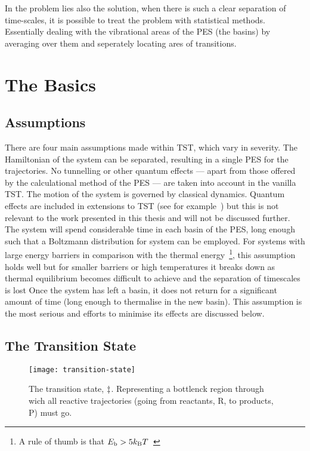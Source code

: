 In the problem lies also the solution, when there is such a clear separation of time-scales, it is possible to treat the problem with statistical methods.
Essentially dealing with the vibrational areas of the PES (the basins) by averaging over them and seperately locating ares of transitions.

\section{The Basics}
\subsection{Assumptions}
There are four main assumptions made within TST, which vary in severity.
The Hamiltonian of the system can be separated, resulting in a single PES for the trajectories.
No tunnelling or other quantum effects --- apart from those offered by the calculational method of the PES --- are taken into account in the vanilla TST.
The motion of the system is governed by classical dynamics.
Quantum effects are included in extensions to TST (see for example~\cite{qtst-hj-1997, qtst-hj-1998, qtst-hj-2009}) but this is not relevant to the work presented in this thesis and will not be discussed further.
The system will spend considerable time in each basin of the PES, long enough such that a Boltzmann distribution for system can be employed.
For systems with large energy barriers in comparison with the thermal energy~\footnote{A rule of thumb is that $E_\text{b} > 5k_\text{B} T$~\cite{htst-5ev-2005}}, this assumption holds well but for smaller barriers or high temperatures it breaks down as thermal equilibrium becomes difficult to achieve and the separation of timescales is lost
Once the system has left a basin, it does not return for a significant amount of time (long enough to thermalise in the new basin).
This assumption is the most serious and efforts to minimise its effects are discussed below.

\subsection{The Transition State}

\begin{figure}[h]
\begin{center}
\texttt{[image: transition-state]}
    \parbox{0.85\linewidth}{
\caption{The transition state, $\ddagger$.
Representing a bottlenck region through wich all reactive trajectories (going from reactants, R, to products, P) must go.
}
\label{fig:transition-state}
    }
\end{center}
\end{figure}

